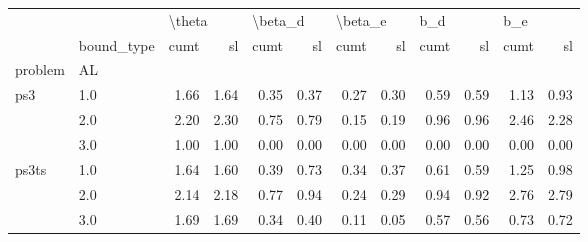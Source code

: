 \begin{tabular}{llrrrrrrrrrr}
\toprule
      & {} & \multicolumn{2}{l}{\textbackslash theta} & \multicolumn{2}{l}{\textbackslash beta\_d} & \multicolumn{2}{l}{\textbackslash beta\_e} & \multicolumn{2}{l}{b\_d} & \multicolumn{2}{l}{b\_e} \\
      & bound\_type &   cumt &   sl &    cumt &   sl &    cumt &   sl & cumt &   sl & cumt &   sl \\
problem & AL &        &      &         &      &         &      &      &      &      &      \\
\midrule
ps3 & 1.0 &   1.66 & 1.64 &    0.35 & 0.37 &    0.27 & 0.30 & 0.59 & 0.59 & 1.13 & 0.93 \\
      & 2.0 &   2.20 & 2.30 &    0.75 & 0.79 &    0.15 & 0.19 & 0.96 & 0.96 & 2.46 & 2.28 \\
      & 3.0 &   1.00 & 1.00 &    0.00 & 0.00 &    0.00 & 0.00 & 0.00 & 0.00 & 0.00 & 0.00 \\
ps3ts & 1.0 &   1.64 & 1.60 &    0.39 & 0.73 &    0.34 & 0.37 & 0.61 & 0.59 & 1.25 & 0.98 \\
      & 2.0 &   2.14 & 2.18 &    0.77 & 0.94 &    0.24 & 0.29 & 0.94 & 0.92 & 2.76 & 2.79 \\
      & 3.0 &   1.69 & 1.69 &    0.34 & 0.40 &    0.11 & 0.05 & 0.57 & 0.56 & 0.73 & 0.72 \\
\bottomrule
\end{tabular}
